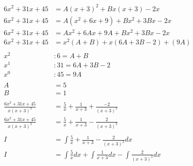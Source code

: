 \documentclass[12pt]{article}
\begin{document}
\begin{align}
    \nonumber                                                                                                \\
    6x^2+31x+45                  & = A(x+3)^2 + Bx(x+3) - 2x                                                 \\
    6x^2+31x+45                  & = A(x^2+6x+9) + Bx^2 + 3Bx - 2x                                           \\
    6x^2+31x+45                  & = Ax^2 + 6Ax + 9A + Bx^2 + 3Bx - 2x                                       \\
    6x^2+31x+45                  & = x^2(A + B) + x(6A + 3B - 2) + (9A)                                      \\
    \nonumber                                                                                                \\
    x^2                          & : 6 = A + B                                                               \\
    x^1                          & : 31 = 6A + 3B - 2                                                        \\
    x^0                          & : 45 = 9A                                                                 \\
    \nonumber                                                                                                \\
    A                            & = 5                                                                       \\
    B                            & = 1                                                                       \\
    \nonumber                                                                                                \\
    \frac{6x^2+31x+45}{x(x+3)^2} & = \frac{5}{x} + \frac{1}{x+3} + \frac{-2}{(x+3)^2}                        \\
    \frac{6x^2+31x+45}{x(x+3)^2} & = \frac{5}{x} + \frac{1}{x+3} - \frac{2}{(x+3)^2}                         \\
    \nonumber                                                                                                \\
    I                            & = \int \frac{5}{x} + \frac{1}{x+3} - \frac{2}{(x+3)^2} dx                 \\
    I                            & = \int \frac{5}{x} dx + \int \frac{1}{x+3} dx - \int \frac{2}{(x+3)^2} dx \\

\end{align}
\end{document}
